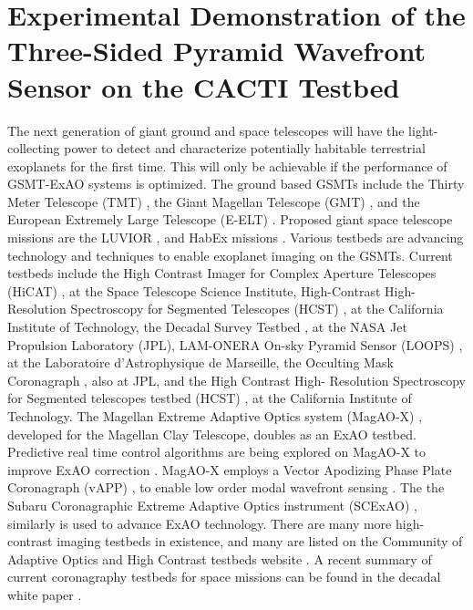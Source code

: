 \chapter{Experimental Demonstration of the Three-Sided Pyramid Wavefront Sensor on the CACTI Testbed}\label{CH6}

The next generation of giant ground and space telescopes will have the light-collecting power to detect and characterize potentially habitable terrestrial exoplanets for the first time. This will only be achievable if the performance of GSMT-ExAO systems is optimized. The ground based GSMTs include the Thirty Meter Telescope (TMT) \citep{chisholm2020thirty}, the Giant Magellan Telescope (GMT) \citep{fanson2020overview}, and the European Extremely Large Telescope (E-ELT) \citep{ramsay2020eso}. Proposed giant space telescope missions are the LUVIOR \citep{2020AAS...23544704O}, and HabEx missions \citep{gaudi2020habitable}. Various testbeds are advancing technology and techniques to enable exoplanet imaging on the GSMTs. Current testbeds include the High Contrast Imager for Complex Aperture Telescopes (HiCAT) \citep{2014SPIE.9143E..27N}, at the Space Telescope Science Institute,  High-Contrast High-Resolution Spectroscopy for Segmented Telescopes (HCST) \citep{jovanovic2018high}, at the California Institute of Technology, the Decadal Survey Testbed \citep{belikov2014ames}, at the NASA Jet Propulsion Laboratory (JPL), LAM-ONERA On-sky Pyramid Sensor (LOOPS) \citep{janin2019adaptive}, at the Laboratoire d'Astrophysique de Marseille, the Occulting Mask Coronagraph \citep{shi2017dynamic}, also at JPL, and the High Contrast High- Resolution Spectroscopy for Segmented telescopes testbed (HCST) \citep{jovanovic2018high}, at the California Institute of Technology. The Magellan Extreme Adaptive Optics system (MagAO-X) \citep{males2020magao}, developed for the Magellan Clay Telescope, doubles as an ExAO testbed. Predictive real time control algorithms are being explored on MagAO-X to improve ExAO correction \citep{haffert2021data}. MagAO-X employs a Vector Apodizing Phase Plate Coronagraph (vAPP) \citep{snik2012vector}, to enable low order modal wavefront sensing \citep{2019JATIS...5d9004M}. The the Subaru Coronagraphic Extreme Adaptive Optics instrument (SCExAO) \citep{jovanovic2015subaru}, similarly is used to advance ExAO technology. There are many more high-contrast imaging testbeds in existence, and many are listed on the Community of Adaptive Optics and High Contrast testbeds website \citep{CHAOTIC}. A recent summary of current coronagraphy testbeds for space missions can be found in the decadal white paper \citep{mazoyer2019high}.

